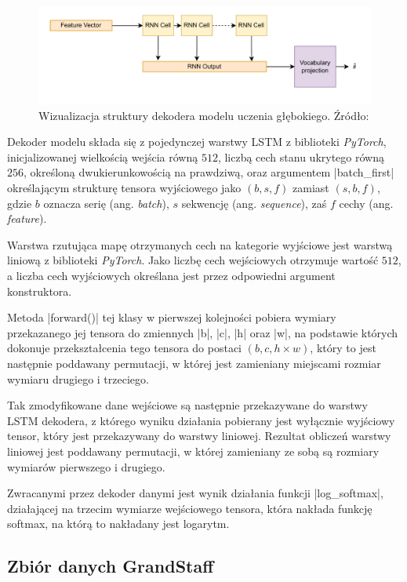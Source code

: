 \begin{figure}[h]
	\centering
	\includegraphics[width=15cm]{images/decoder-model.png}
	\caption{Wizualizacja struktury dekodera modelu uczenia głębokiego. Źródło: \cite{Rios-Vila2023}}
	\label{fig:decoder-model-vis}
\end{figure}

Dekoder modelu składa się z pojedynczej warstwy LSTM z biblioteki \textit{PyTorch}, inicjalizowanej wielkością wejścia równą $512$, liczbą cech stanu ukrytego równą $256$, określoną dwukierunkowością na prawdziwą, oraz argumentem \pyth|batch_first| określającym strukturę tensora wyjściowego jako $(b, s, f)$ zamiast $(s, b, f)$, gdzie $b$ oznacza serię (ang. \textit{batch}), $s$ sekwencję (ang. \textit{sequence}), zaś $f$ cechy (ang. \textit{feature}).

Warstwa rzutująca mapę otrzymanych cech na kategorie wyjściowe jest warstwą liniową z biblioteki \textit{PyTorch}. Jako liczbę cech wejściowych otrzymuje wartość $512$, a liczba cech wyjściowych określana jest przez odpowiedni argument konstruktora.

Metoda \pyth|forward()| tej klasy w pierwszej kolejności pobiera wymiary przekazanego jej tensora do zmiennych \pyth|b|, \pyth|c|, \pyth|h| oraz \pyth|w|, na podstawie których dokonuje przekształcenia tego tensora do postaci $(b, c, h \times w)$, który to jest następnie poddawany permutacji, w której jest zamieniany miejscami rozmiar wymiaru drugiego i trzeciego.

Tak zmodyfikowane dane wejściowe są następnie przekazywane do warstwy LSTM dekodera, z którego wyniku działania pobierany jest wyłącznie wyjściowy tensor, który jest przekazywany do warstwy liniowej. Rezultat obliczeń warstwy liniowej jest poddawany permutacji, w której zamieniany ze sobą są rozmiary wymiarów pierwszego i drugiego.

Zwracanymi przez dekoder danymi jest wynik działania funkcji \pyth|log_softmax|, działającej na trzecim wymiarze wejściowego tensora, która nakłada funkcję softmax, na którą to nakładany jest logarytm.

\subsection{Zbiór danych GrandStaff}

